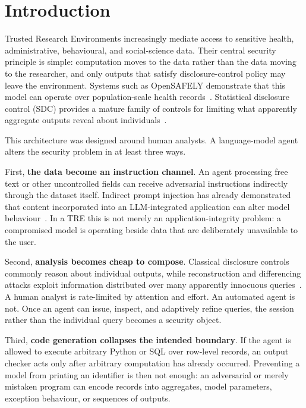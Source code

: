 \documentclass[11pt,a4paper]{article}
\begin{document}
\section{Introduction}
\label{sec:introduction}

Trusted Research Environments increasingly mediate access to sensitive health,
administrative, behavioural, and social-science data. Their central security
principle is simple: computation moves to the data rather than the data moving
to the researcher, and only outputs that satisfy disclosure-control policy may
leave the environment. Systems such as OpenSAFELY demonstrate that this model
can operate over population-scale health records~\cite{opensafely2020}.
Statistical disclosure control (SDC) provides a mature family of controls for
limiting what apparently aggregate outputs reveal about individuals~\cite{hundepool2012}.

This architecture was designed around human analysts. A language-model agent
alters the security problem in at least three ways.

First, \textbf{the data become an instruction channel}. An agent processing free
text or other uncontrolled fields can receive adversarial instructions
indirectly through the dataset itself. Indirect prompt injection has already
demonstrated that content incorporated into an LLM-integrated application can
alter model behaviour~\cite{greshake2023}. In a TRE this is not merely an
application-integrity problem: a compromised model is operating beside data
that are deliberately unavailable to the user.

Second, \textbf{analysis becomes cheap to compose}. Classical disclosure
controls commonly reason about individual outputs, while reconstruction and
differencing attacks exploit information distributed over many apparently
innocuous queries~\cite{dinur2003}. A human analyst is rate-limited by attention
and effort. An automated agent is not. Once an agent can issue, inspect, and
adaptively refine queries, the session rather than the individual query becomes
a security object.

Third, \textbf{code generation collapses the intended boundary}. If the agent is
allowed to execute arbitrary Python or SQL over row-level records, an output
checker acts only after arbitrary computation has already occurred. Preventing
a model from printing an identifier is then not enough: an adversarial or
merely mistaken program can encode records into aggregates, model parameters,
exception behaviour, or sequences of outputs.
\end{document}
